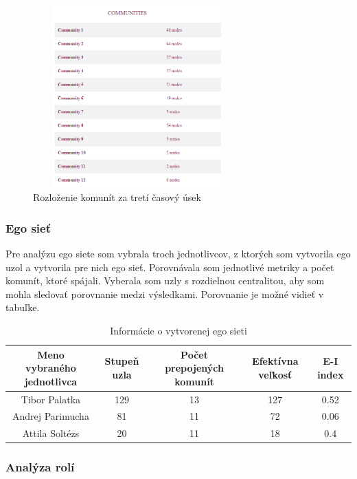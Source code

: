 \documentclass[slovak,master,public,dept460,male,cpdeclaration,oneside]{diploma}
\begin{document}
\begin{figure}[H]
\centering
\includegraphics[width=8cm, height=7cm]{figures/team_communities_tab_third}
\caption{Rozloženie komunít za tretí časový úsek}
\label{team_communities_third}
\end{figure}



\subsubsection{Ego sieť}
Pre analýzu ego siete som vybrala troch jednotlivcov, z ktorých som vytvorila ego uzol a vytvorila pre nich ego sieť. Porovnávala som jednotlivé metriky a počet komunít, ktoré spájali. Vyberala som uzly s rozdielnou centralitou, aby som mohla sledovať porovnanie medzi výsledkami. Porovnanie je možné vidieť v tabuľke.

\begin{table}[h!]
\centering
\begin{tabular}{ |c|c|c|c|c| }
 \hline
 Meno vybraného jednotlivca & Stupeň uzla & Počet prepojených komunít & Efektívna veľkosť & E-I index \\ 
 \hline
 Tibor Palatka    & 129  & 13  & 127  &  0.52 \\  
  \hline
 Andrej Parimucha &  81  &  11 & 72 & 0.06  \\ 
  \hline
 Attila Soltézs   & 20   &  11 &  18 & 0.4  \\ 
  \hline

\end{tabular}
\caption{Informácie o vytvorenej ego sieti}
\end{table} 


\subsubsection{Analýza rolí}
\end{document}
